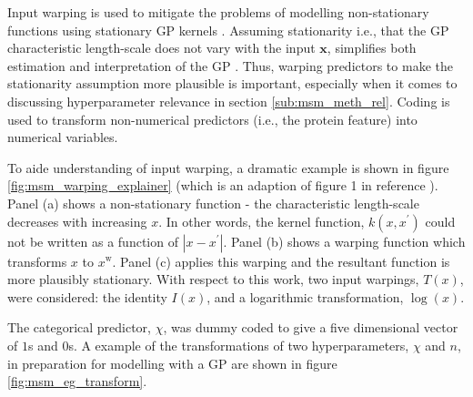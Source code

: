 Input warping is used to mitigate the problems of modelling non-stationary functions using stationary GP kernels \cite{snoekInputWarpingBayesian2014a}. Assuming stationarity i.e., that the GP characteristic length-scale  does not vary with the input $\mathbf{x}$, simplifies both estimation and interpretation of the GP \cite{snoekInputWarpingBayesian2014a}. Thus, warping predictors to make the stationarity assumption more plausible is important, especially when it comes to discussing hyperparameter relevance in section \ref{sub:msm_meth_rel}. Coding is used to transform non-numerical predictors (i.e., the protein feature) into numerical variables. 

To aide understanding of input warping, a dramatic example is shown in figure \ref{fig:msm_warping_explainer} (which is an adaption of figure 1 in reference \cite{snoekInputWarpingBayesian2014a}). Panel (a) shows a non-stationary function - the characteristic length-scale decreases with increasing $x$. In other words, the kernel function, $k(x, x^{\prime})$ could not be written as a function of $|x-x^{\prime}|$. Panel (b) shows a warping function which transforms $x$ to $x^{\mathrm{w}}$. Panel (c) applies this warping and the resultant function is more plausibly stationary. With respect to this work, two input warpings, $T(x)$, were considered: the identity $I(x)$, and a logarithmic transformation, $\log(x)$.  

The categorical predictor, $\chi$, was dummy coded \cite{dalyDummyCodingVs2016} to give a five dimensional vector of $1$s and $0$s.  A example of the transformations of two hyperparameters, $\chi$ and $n$, in preparation for modelling with a GP are shown in figure \ref{fig:msm_eg_transform}. 

